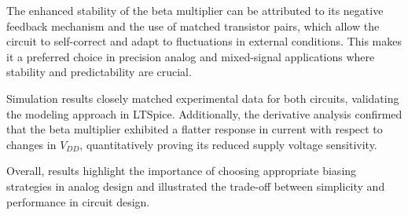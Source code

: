 The enhanced stability of the beta multiplier can be attributed to its negative feedback mechanism and the use of matched transistor pairs, which allow the circuit to self-correct and adapt to fluctuations in external conditions. This makes it a preferred choice in precision analog and mixed-signal applications where stability and predictability are crucial.

Simulation results closely matched experimental data for both circuits, validating the modeling approach in LTSpice. Additionally, the derivative analysis confirmed that the beta multiplier exhibited a flatter response in current with respect to changes in $V_{DD}$​, quantitatively proving its reduced supply voltage sensitivity.

Overall, results highlight the importance of choosing appropriate biasing strategies in analog design and illustrated the trade-off between simplicity and performance in circuit design.


% 
